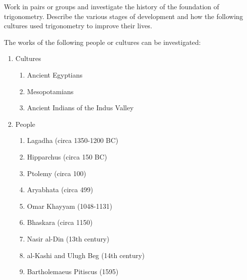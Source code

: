       \label{m39405*id77524}Work in pairs or groups and investigate the history of the foundation of trigonometry. Describe the various stages of development and how the following cultures used trigonometry to improve their lives.\par 
      \label{m39405*id77870}The works of the following people or cultures can be investigated:\par 
      \label{m39405*id77873}\begin{enumerate}[noitemsep, label=\textbf{\arabic*}. ] 
            \label{m39405*uid1}\item Cultures
\label{m39405*id77887}\begin{enumerate}[noitemsep, label=\textbf{\alph*}. ] 
            \label{m39405*uid2}\item Ancient Egyptians
\label{m39405*uid3}\item Mesopotamians
\label{m39405*uid4}\item Ancient Indians of the Indus Valley
\end{enumerate}
        \label{m39405*uid5}\item People
\label{m39405*id77937}\begin{enumerate}[noitemsep, label=\textbf{\alph*}. ] 
            \label{m39405*uid6}\item Lagadha (circa 1350-1200 BC)
\label{m39405*uid7}\item Hipparchus (circa 150 BC)
\label{m39405*uid8}\item Ptolemy (circa 100)
\label{m39405*uid9}\item Aryabhata (circa 499)
\label{m39405*uid10}\item Omar Khayyam (1048-1131)
\label{m39405*uid11}\item Bhaskara (circa 1150)
\label{m39405*uid12}\item Nasir al-Din (13th century)
\label{m39405*uid13}\item al-Kashi and Ulugh Beg (14th century)
\label{m39405*uid14}\item Bartholemaeus Pitiscus (1595)
\end{enumerate}
        \end{enumerate}
        
      


